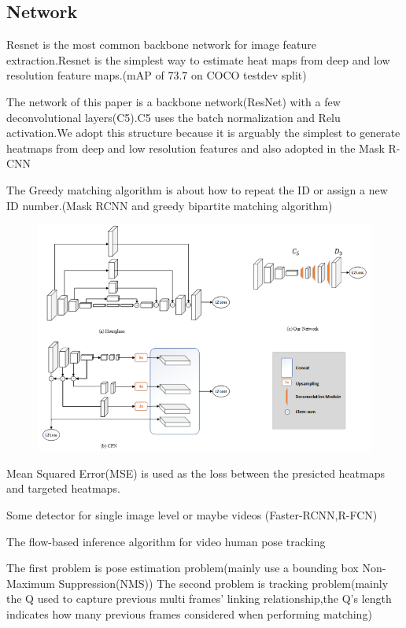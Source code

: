 \documentclass[11pt]{article}
\begin{document}
\subsection{Network}

Resnet is the most common backbone network for image feature extraction.Resnet is the simplest way to estimate heat maps from deep and low resolution feature maps.(mAP of 73.7 on COCO testdev split)

The network of this paper is a backbone network(ResNet) with a few deconvolutional layers(C5).C5 uses the batch normalization and Relu activation.We adopt this structure because it is arguably the simplest to generate heatmaps from deep and low resolution features and also adopted in the Mask R-CNN

The Greedy matching algorithm is about how to repeat the ID or assign a new ID number.(Mask RCNN and greedy bipartite matching algorithm)

\begin{figure}[h]
	\centering
	\includegraphics[scale = 0.5]{1}
\end{figure}

Mean Squared Error(MSE) is used as the loss between the presicted heatmaps and targeted heatmaps.

Some detector for single image level or maybe videos (Faster-RCNN,R-FCN)

The flow-based inference algorithm for video human pose tracking

The first problem is pose estimation problem(mainly use a bounding box Non-Maximum Suppression(NMS))
The second problem is tracking problem(mainly the Q used to capture previous multi frames' linking relationship,the Q's length indicates how many previous frames considered when performing matching)
\end{document}
